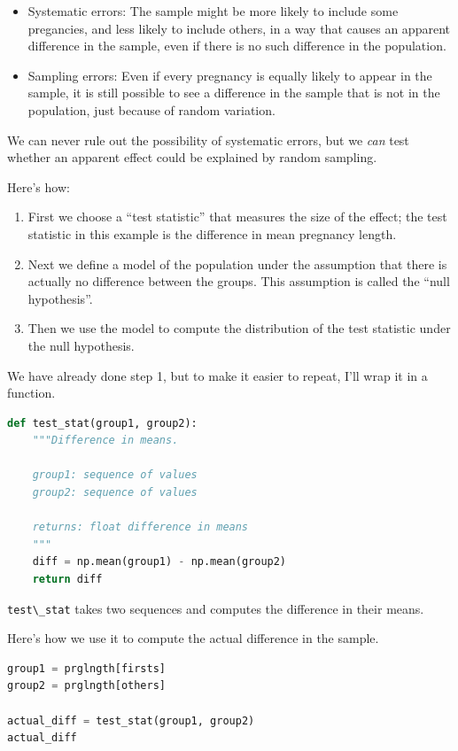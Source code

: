 \begin{itemize}
\item
  Systematic errors: The sample might be more likely to include some
  pregancies, and less likely to include others, in a way that causes an
  apparent difference in the sample, even if there is no such difference
  in the population.
\item
  Sampling errors: Even if every pregnancy is equally likely to appear
  in the sample, it is still possible to see a difference in the sample
  that is not in the population, just because of random variation.
\end{itemize}

We can never rule out the possibility of systematic errors, but we
\emph{can} test whether an apparent effect could be explained by random
sampling.

Here's how:

\begin{enumerate}
\def\labelenumi{\arabic{enumi}.}
\item
  First we choose a ``test statistic'' that measures the size of the
  effect; the test statistic in this example is the difference in mean
  pregnancy length.
\item
  Next we define a model of the population under the assumption that
  there is actually no difference between the groups. This assumption is
  called the ``null hypothesis''.
\item
  Then we use the model to compute the distribution of the test
  statistic under the null hypothesis.
\end{enumerate}

We have already done step 1, but to make it easier to repeat, I'll wrap
it in a function.

\begin{lstlisting}[language=Python]
def test_stat(group1, group2):
    """Difference in means.
    
    group1: sequence of values
    group2: sequence of values
    
    returns: float difference in means
    """
    diff = np.mean(group1) - np.mean(group2)
    return diff
\end{lstlisting}

\passthrough{\lstinline!test\_stat!} takes two sequences and computes
the difference in their means.

Here's how we use it to compute the actual difference in the sample.

\begin{lstlisting}[language=Python]
group1 = prglngth[firsts]
group2 = prglngth[others]

actual_diff = test_stat(group1, group2)
actual_diff
\end{lstlisting}


